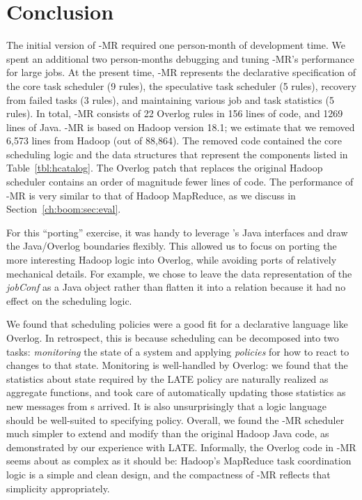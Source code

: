 \section{Conclusion}
The initial version of \BOOM-MR required one person-month of
development time. We spent an additional two person-months debugging
and tuning \BOOM-MR's performance for large jobs. At the present time, 
\BOOM-MR represents the declarative specification of the core task scheduler (9 rules), 
the speculative task scheduler (5 rules), recovery from failed tasks (3 rules), and maintaining various 
job and task statistics (5 rules). In total, \BOOM-MR consists of 22 Overlog rules in 156 lines of 
code, and 1269 lines of Java. \BOOM-MR is based on Hadoop version 18.1; we estimate 
that we removed 6,573 lines from Hadoop (out of 88,864). The removed code contained
the core scheduling logic and the data structures that represent the
components listed in Table~\ref{tbl:hcatalog}. The Overlog patch that
replaces the original Hadoop scheduler contains an order of magnitude
fewer lines of code.  The performance of \BOOM-MR is very similar to
that of Hadoop MapReduce, as we discuss in Section~\ref{ch:boom:sec:eval}.


For this ``porting'' exercise, it was handy to leverage \JOL's Java interfaces
and draw the Java/Overlog boundaries flexibly.  This allowed us to focus on
porting the more interesting Hadoop logic into Overlog, while avoiding ports of
relatively mechanical details.  For example, we chose to leave the data
representation of the \emph{jobConf} as a Java object rather than flatten it
into a relation because it had no effect on the scheduling logic.

We found that scheduling policies were a good fit for a declarative language
like Overlog. In retrospect, this is because scheduling can be decomposed into
two tasks: \emph{monitoring} the state of a system and applying \emph{policies}
for how to react to changes to that state. Monitoring is well-handled by
Overlog: we found that the statistics about {\TT} state required by the LATE
policy are naturally realized as aggregate functions, and \JOL took care of
automatically updating those statistics as new messages from {\TT}s arrived. It
is also unsurprisingly that a logic language should be well-suited to specifying
policy. Overall, we found the \BOOM-MR scheduler much simpler to extend and
modify than the original Hadoop Java code, as demonstrated by our experience
with LATE\@.  Informally, the Overlog code in \BOOM-MR seems about as complex as
it should be: Hadoop's MapReduce task coordination logic is a simple and clean
design, and the compactness of \BOOM-MR reflects that simplicity appropriately.

